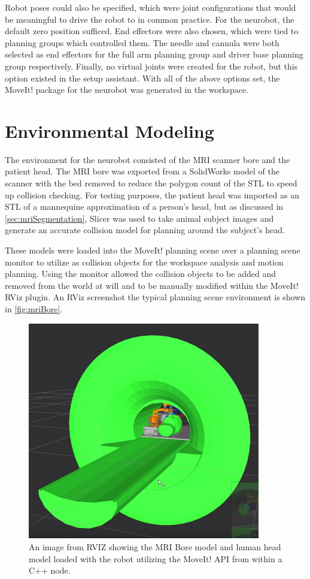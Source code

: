 \documentclass[12pt]{report}
\begin{document}
Robot poses could also be specified, which were joint configurations that would be meaningful to drive the robot to in common practice. For the neurobot, the default zero position sufficed. End effectors were also chosen, which were tied to planning groups which controlled them. The needle and cannula were both selected as end effectors for the full arm planning group and driver base planning group respectively. Finally, no virtual joints were created for the robot, but this option existed in the setup assistant. With all of the above options set, the MoveIt! package for the neurobot was generated in the workspace.


\section{Environmental Modeling}
The environment for the neurobot consisted of the MRI scanner bore and the patient head. The MRI bore was exported from a SolidWorks model of the scanner with the bed removed to reduce the polygon count of the STL to speed up collision checking. For testing purposes, the patient head was imported as an STL of a mannequine approximation of a person's head, but as discussed in \autoref{sec:mriSegmentation}, Slicer was used to take animal subject images and generate an accurate collision model for planning around the subject's head.

These models were loaded into the MoveIt! planning scene over a planning scene monitor to utilize as collision objects for the workspace analysis and motion planning. Using the monitor allowed the collision objects to be added and removed from the world at will and to be manually modified within the MoveIt! RViz plugin. An RViz screenshot the typical planning scene environment is shown in \autoref{fig:mriBore}.

\begin{figure}[thpb]
	\centering
	\includegraphics[width = 4in]{images/mri_bore_and_head.png}
    \caption{An image from RVIZ showing the MRI Bore model and human head model loaded with the robot utilizing the MoveIt! API from within a C++ node.}
    \label{fig:mriBore}
\end{figure}
\end{document}
